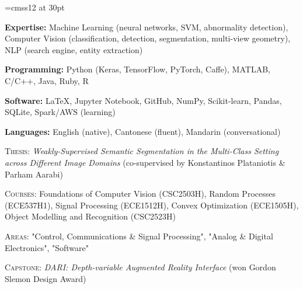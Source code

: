 \documentclass[letterpaper, 12pt]{cv_style}
\begin{document}
\font\titlefont=cmss12 at 30pt


\begin{ditem}
	\item \textbf{Expertise:} Machine Learning (neural networks, SVM, abnormality detection), Computer Vision (classification, detection, segmentation, multi-view geometry), NLP (search engine, entity extraction)
	\item \textbf{Programming:} Python (Keras, TensorFlow, PyTorch, Caffe), MATLAB, C/C++, Java, Ruby, R
	\item \textbf{Software:} \LaTeX, Jupyter Notebook, GitHub, NumPy, Scikit-learn, Pandas, SQLite, Spark/AWS (learning)
	\item \textbf{Languages:} English (native), Cantonese (fluent), Mandarin (conversational)
\end{ditem}

\flushleft{}
\begin{ditem}
	\item \textsc{Thesis:} \textit{Weakly-Supervised Semantic Segmentation in the Multi-Class Setting across Different Image Domains} (co-supervised by Konstantinos Plataniotis \& Parham Aarabi)
	\item \textsc{Courses:} Foundations of Computer Vision (CSC2503H), Random Processes (ECE537H1), Signal Processing (ECE1512H), Convex Optimization (ECE1505H), Object Modelling and Recognition (CSC2523H)
\end{ditem}
\medspace
{}
\begin{ditem}
	\item \textsc{Areas:} "Control, Communications \& Signal Processing", "Analog \& Digital Electronics", "Software"
	\item \textsc{Capstone:} \textit{DARI: Depth-variable Augmented Reality Interface} (won Gordon Slemon Design Award)
\end{ditem}
\end{document}
